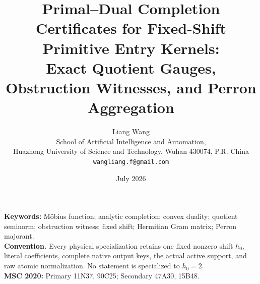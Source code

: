 \documentclass[11pt]{article}
\title{Primal--Dual Completion Certificates for Fixed-Shift Primitive Entry Kernels:\\
Exact Quotient Gauges, Obstruction Witnesses, and Perron Aggregation}
\author{Liang Wang\\
School of Artificial Intelligence and Automation,\\
Huazhong University of Science and Technology, Wuhan 430074, P.R. China\\
\texttt{wangliang.f@gmail.com}}
\date{July 2026}
\theoremstyle{remark}
\begin{document}
\maketitle


\noindent\textbf{Keywords:} M\"obius function; analytic completion;
convex duality; quotient seminorm; obstruction witness; fixed shift;
Hermitian Gram matrix; Perron majorant.\\[0.5em]
\noindent\textbf{Convention.} Every physical specialization retains one
fixed nonzero shift \(h_0\), literal coefficients, complete native output
keys, the actual active support, and raw atomic normalization.  No
statement is specialized to \(h_0=2\).\\[0.5em]
\noindent\textbf{MSC 2020:} Primary 11N37, 90C25; Secondary 47A30, 15B48.











\begingroup
\small
\raggedright


\endgroup
\end{document}
